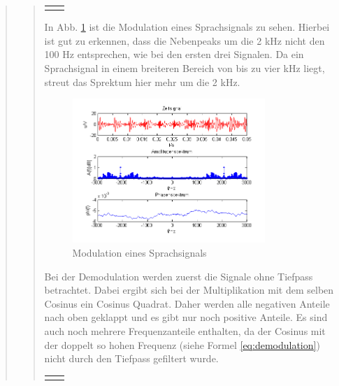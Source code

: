 \begin{quote}
\begin{quote}
\begin{center}
\begin{tabular}{ll}
\begin{minipage}{0.67\textwidth}
            \end{minipage}
        
        \end{tabular}
        \end{center}
        
        In Abb. \ref{fig:Sprache} ist die Modulation eines Sprachsignals zu
        sehen. Hierbei ist gut zu erkennen, dass die Nebenpeaks um die 2 kHz
        nicht den 100 Hz entsprechen, wie bei den ersten drei Signalen. Da ein
        Sprachsignal in einem breiteren Bereich von bis zu vier kHz liegt,
        streut das Sprektum hier mehr um die 2 kHz.
        
    \begin{figure}[H]
		\begin{center}
			\includegraphics[width=0.8\textwidth]{Bilder/Sprachsignal}
		\end{center}
		\caption{Modulation eines Sprachsignals}
		\label{fig:Sprache}
	\end{figure}
        
        Bei der Demodulation werden zuerst die Signale ohne Tiefpass betrachtet.
        Dabei ergibt sich bei der Multiplikation mit dem selben Cosinus ein
        Cosinus Quadrat. Daher werden alle negativen Anteile nach oben geklappt
        und es gibt nur noch positive Anteile. Es sind auch noch mehrere
        Frequenzanteile enthalten, da der Cosinus mit der doppelt so hohen
        Frequenz (siehe Formel \ref{eq:demodulation}) nicht durch den Tiefpass
        gefiltert wurde.
      
         \begin{center}
        \begin{tabular}{ll}
        
        \hspace{-5cm}
            \begin{minipage}{0.67\textwidth}
                

\end{minipage}
\end{tabular}
\end{center}
\end{quote}
\end{quote}
